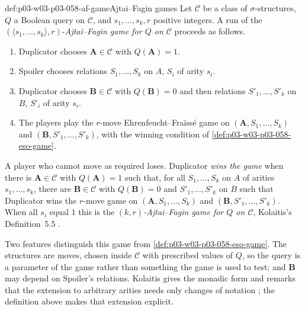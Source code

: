 \begin{hbdefinition}{def:p03-w03-p03-058-af-game}{Ajtai--Fagin games}
Let \(\mathcal C\) be a class of \(\sigma\)-structures, \(Q\) a Boolean query
on \(\mathcal C\), and \(s_1,\ldots,s_k,r\) positive integers. A run of the
\((\langle s_1,\ldots,s_k\rangle,r)\)-\emph{Ajtai--Fagin game for \(Q\) on
\(\mathcal C\)} proceeds as follows.
\begin{enumerate}
\item Duplicator chooses \(\mathbf A\in\mathcal C\) with \(Q(\mathbf A)=1\).
\item Spoiler chooses relations \(S_1,\ldots,S_k\) on \(A\), \(S_i\) of
      arity \(s_i\).
\item Duplicator chooses \(\mathbf B\in\mathcal C\) with
      \(Q(\mathbf B)=0\) and then relations \(S'_1,\ldots,S'_k\) on \(B\),
      \(S'_i\) of arity \(s_i\).
\item The players play the \(r\)-move Ehrenfeucht--Fra\"iss\'e game on
      \((\mathbf A,S_1,\ldots,S_k)\) and \((\mathbf B,S'_1,\ldots,S'_k)\),
      with the winning condition of \cref{def:p03-w03-p03-058-eso-game}.
\end{enumerate}
A player who cannot move as required loses. Duplicator \emph{wins the game}
when there is \(\mathbf A\in\mathcal C\) with \(Q(\mathbf A)=1\) such that,
for all \(S_1,\ldots,S_k\) on \(A\) of arities \(s_1,\ldots,s_k\), there
are \(\mathbf B\in\mathcal C\) with \(Q(\mathbf B)=0\) and
\(S'_1,\ldots,S'_k\) on \(B\) such that Duplicator wins the \(r\)-move game
on \((\mathbf A,S_1,\ldots,S_k)\) and \((\mathbf B,S'_1,\ldots,S'_k)\).
When all \(s_i\) equal \(1\) this is the \emph{\((k,r)\)-Ajtai--Fagin game
for \(Q\) on \(\mathcal C\)}, Kolaitis's Definition~5.5
\cite[pp.~27--28]{Kolaitis2003ExpressivePowerNotes}.
\end{hbdefinition}

Two features distinguish this game from
\cref{def:p03-w03-p03-058-eso-game}. The structures are moves, chosen inside
\(\mathcal C\) with prescribed values of \(Q\), so the query is a parameter of
the game rather than something the game is used to test; and
\(\mathbf B\) may depend on Spoiler's relations. Kolaitis gives the monadic
form and remarks that the extension to arbitrary arities needs only changes
of notation \cite[p.~27]{Kolaitis2003ExpressivePowerNotes}; the definition
above makes that extension explicit.

